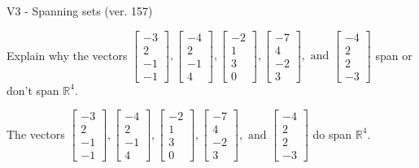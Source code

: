 \begin{exercise}
  \begin{exerciseTitle}V3 - Spanning sets (ver. 157)\end{exerciseTitle}
  \begin{exerciseStatement}
    Explain why the vectors \(\left[\begin{array}{r}
-3 \\
2 \\
-1 \\
-1
\end{array}\right] , \left[\begin{array}{r}
-4 \\
2 \\
-1 \\
4
\end{array}\right] , \left[\begin{array}{r}
-2 \\
1 \\
3 \\
0
\end{array}\right] , \left[\begin{array}{r}
-7 \\
4 \\
-2 \\
3
\end{array}\right] , \text{ and } \left[\begin{array}{r}
-4 \\
2 \\
2 \\
-3
\end{array}\right]\) span or don't span \(\mathbb{R}^4\). 
	


  \end{exerciseStatement}
  \begin{exerciseAnswer}
   The vectors \(\left[\begin{array}{r}
-3 \\
2 \\
-1 \\
-1
\end{array}\right] , \left[\begin{array}{r}
-4 \\
2 \\
-1 \\
4
\end{array}\right] , \left[\begin{array}{r}
-2 \\
1 \\
3 \\
0
\end{array}\right] , \left[\begin{array}{r}
-7 \\
4 \\
-2 \\
3
\end{array}\right] , \text{ and } \left[\begin{array}{r}
-4 \\
2 \\
2 \\
-3
\end{array}\right]\) 
  	 do  
	span \(\mathbb{R}^4\).
  



\end{exerciseAnswer}
\end{exercise}
